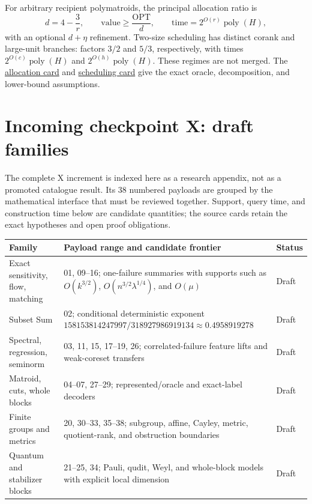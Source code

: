 \documentclass[10pt,a4paper]{article}
\newcommand{\repo}[2]{\href{https://github.com/icekylinx/algorithm-frontier/#1}{#2}}
\newcommand{\poly}{\operatorname{poly}}
\theoremstyle{recordstyle}
\begin{document}
For arbitrary recipient polymatroids, the principal allocation ratio is
\[
 d=4-\frac{3}{r},\qquad \text{value}\geq \frac{\mathrm{OPT}}{d},
 \qquad \text{time}=2^{O(r)}\poly(H),
\]
with an optional $d+\eta$ refinement.  Two-size scheduling has distinct
corank and large-unit branches: factors $3/2$ and $5/3$, respectively, with
times $2^{O(c)}\poly(H)$ and $2^{O(h)}\poly(H)$.  These regimes are not merged.
The \repo{problems/recipient-polymatroid/}{allocation card} and
\repo{problems/two-size-scheduling/}{scheduling card} give the exact oracle,
decomposition, and lower-bound assumptions.

\section{Incoming checkpoint X: draft families}
The complete X increment is indexed here as a research appendix, not as a
promoted catalogue result.  Its 38 numbered payloads are grouped by the
mathematical interface that must be reviewed together.  Support, query time,
and construction time below are candidate quantities; the source cards retain
the exact hypotheses and open proof obligations.

\begin{center}
\begin{tabularx}{0.96\linewidth}{@{}P{38mm}Y P{22mm}@{}}
\toprule
Family & Payload range and candidate frontier & Status\\
\midrule
Exact sensitivity, flow, matching & 01, 09--16; one-failure summaries with
supports such as $O(k^{3/2})$, $O(n^{3/2}\lambda^{1/4})$, and $O(\mu)$ & Draft\\
Subset Sum & 02; conditional deterministic exponent
$158153814247997/318927986919134\approx0.4958919278$ & Draft\\
Spectral, regression, seminorm & 03, 11, 15, 17--19, 26; correlated-failure
feature lifts and weak-coreset transfers & Draft\\
Matroid, cuts, whole blocks & 04--07, 27--29; represented/oracle and exact-label
decoders & Draft\\
Finite groups and metrics & 20, 30--33, 35--38; subgroup, affine, Cayley,
metric, quotient-rank, and obstruction boundaries & Draft\\
Quantum and stabilizer blocks & 21--25, 34; Pauli, qudit, Weyl, and whole-block
models with explicit local dimension & Draft\\
\bottomrule
\end{tabularx}
\end{center}
\end{document}
